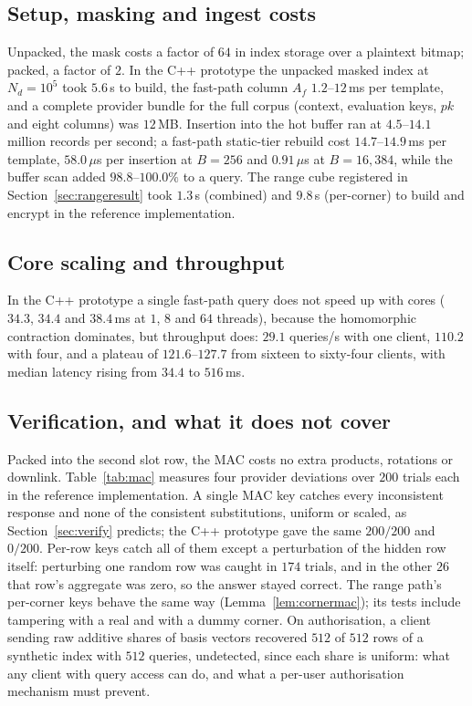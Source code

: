 \documentclass[a4paper,fleqn]{cas-sc}
\newif\ifauthorchecks
\newcommand{\authorcheck}[1]{\ifauthorchecks{\color{red}\textsf{[Authors: #1]}}\fi}
\begin{document}
\subsection{Setup, masking and ingest costs}
\label{sec:setupresult}
Unpacked, the mask costs a factor of $64$ in index storage over a plaintext
bitmap; packed, a factor of $2$. In the C++ prototype the unpacked masked index
at $N_d=10^5$ took $5.6$\,s to build, the fast-path column $A_f$ $1.2$--$12$\,ms
per template, and a complete provider bundle for the full corpus (context,
evaluation keys, $pk$ and eight columns) was $12$\,MB. Insertion into the hot
buffer ran at $4.5$--$14.1$ million records per second; a fast-path static-tier
rebuild cost $14.7$--$14.9$\,ms per template, $58.0\,\mu$s per insertion at
$B=256$ and $0.91\,\mu$s at $B=16{,}384$, while the buffer scan added
$98.8$--$100.0\%$ to a query. The range cube registered in
Section~\ref{sec:rangeresult} took $1.3$\,s (combined) and $9.8$\,s
(per-corner) to build and encrypt in the reference implementation.
\authorcheck{Re-measure the masked-index build with rejection sampling and
packing in C++.}

\subsection{Core scaling and throughput}
\label{sec:scaling}
In the C++ prototype a single fast-path query does not speed up with cores
($34.3$, $34.4$ and $38.4$\,ms at $1$, $8$ and $64$ threads), because the
homomorphic contraction dominates, but throughput does: $29.1$ queries/s with
one client, $110.2$ with four, and a plateau of $121.6$--$127.7$ from sixteen
to sixty-four clients, with median latency rising from $34.4$ to $516$\,ms.

\subsection{Verification, and what it does not cover}
\label{sec:verifyresult}
\label{sec:authresult}
Packed into the second slot row, the MAC costs no extra products, rotations or
downlink. Table~\ref{tab:mac} measures four provider deviations over $200$
trials each in the reference implementation. A single MAC key catches every
inconsistent response and none of the consistent substitutions, uniform or
scaled, as Section~\ref{sec:verify} predicts; the C++ prototype gave the same
$200/200$ and $0/200$. Per-row keys catch all of them except a perturbation of
the hidden row itself: perturbing one random row was caught in $174$ trials,
and in the other $26$ that row's aggregate was zero, so the answer stayed
correct. The range path's per-corner keys behave the same way
(Lemma~\ref{lem:cornermac}); its tests include tampering with a real and with
a dummy corner. On authorisation, a client sending raw additive shares of
basis vectors recovered $512$ of $512$ rows of a synthetic index with $512$
queries, undetected, since each share is uniform: what any client with query
access can do, and what a per-user authorisation mechanism must prevent.
\end{document}
